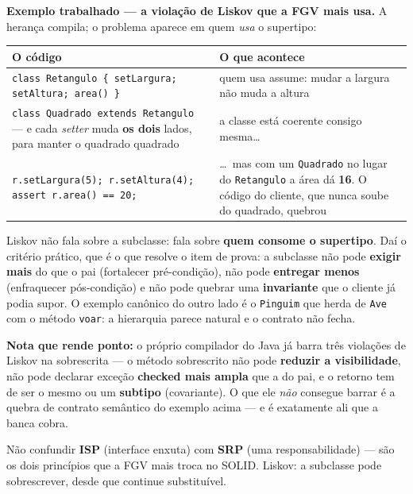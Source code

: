 \textbf{Exemplo trabalhado --- a violação de Liskov que a FGV mais usa.} A
herança compila; o problema aparece em quem \emph{usa} o supertipo:

\begin{center}
\begin{tabular}{@{}p{5.5cm}p{6.1cm}@{}}
\toprule
\textbf{O código} & \textbf{O que acontece} \\
\midrule
\texttt{class Retangulo \{ setLargura; setAltura; area() \}} & quem usa
assume: mudar a largura não muda a altura \\
\texttt{class Quadrado extends Retangulo} --- e cada \emph{setter} muda
\textbf{os dois} lados, para manter o quadrado quadrado & a classe está
coerente consigo mesma\ldots \\
\texttt{r.setLargura(5); r.setAltura(4);} \newline
\texttt{assert r.area() == 20;} & \ldots\ mas com um \texttt{Quadrado} no lugar
do \texttt{Retangulo} a área dá \textbf{16}. O código do cliente, que nunca
soube do quadrado, quebrou \\
\bottomrule
\end{tabular}
\end{center}

Liskov não fala sobre a subclasse: fala sobre \textbf{quem consome o
supertipo}. Daí o critério prático, que é o que resolve o item de prova: a
subclasse não pode \textbf{exigir mais} do que o pai (fortalecer
pré-condição), não pode \textbf{entregar menos} (enfraquecer pós-condição) e
não pode quebrar uma \textbf{invariante} que o cliente já podia supor. O
exemplo canônico do outro lado é o \texttt{Pinguim} que herda de \texttt{Ave}
com o método \texttt{voar}: a hierarquia parece natural e o contrato não fecha.

\textbf{Nota que rende ponto:} o próprio compilador do Java já barra três
violações de Liskov na sobrescrita --- o método sobrescrito não pode
\textbf{reduzir a visibilidade}, não pode declarar exceção \textbf{checked mais
ampla} que a do pai, e o retorno tem de ser o mesmo ou um \textbf{subtipo}
(covariante). O que ele \emph{não} consegue barrar é a quebra de contrato
semântico do exemplo acima --- e é exatamente ali que a banca cobra.

\begin{pegadinha}
Não confundir \textbf{ISP} (interface enxuta) com \textbf{SRP} (uma
responsabilidade) --- são os dois princípios que a FGV mais troca no SOLID.
Liskov: a subclasse pode sobrescrever, desde que continue substituível.
\end{pegadinha}

